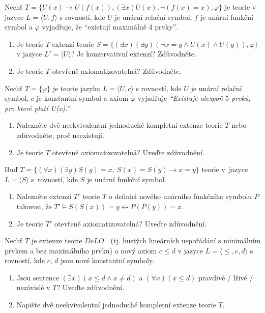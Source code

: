 \documentclass[a4paper,12pt]{article}
\begin{document}
\medskip\begin{problem}
    Nechť $T = \{U(x) \to U(f(x)), (\exists x)U(x), \neg (f(x) = x), \varphi\}$ je teorie v jazyce $L = \langle U, f \rangle$ s rovností, kde $U$ je unární relační symbol, $f$ je unární funkční symbol a $\varphi$ vyjadřuje, že ``existují maximálně 4 prvky''.
    \begin{enumerate}
    \item Je teorie $T$ extenzí teorie $S = \{ (\exists x)(\exists y)(\neg x = y \land U(x) \land U(y)), \varphi \}$ v jazyce $L' = \langle U \rangle$? Je konzervativní extenzí? Zdůvodněte.
    \item Je teorie $T$ otevřeně axiomatizovatelná? Zdůvodněte.
    \end{enumerate} 
\end{problem}

\medskip\begin{problem}
Nechť $T=\{\varphi\}$ je teorie jazyka $L=\langle U, c \rangle$ s rovností, kde $U$ je unární relační symbol, $c$ je konstantní symbol a axiom $\varphi$ vyjadřuje \emph{``Existuje alespoň $5$ prvků, pro které platí U(x).''}
\begin{enumerate}
\item Nalezněte dvě neekvivalentní jednoduché kompletní extenze teorie $T$ nebo zdůvodněte, proč neexistují.
\item Je teorie $T$ otevřeně axiomatizovatelná? Uveďte zdůvodnění.
\end{enumerate}
\end{problem}


\medskip\begin{problem} %
    Buď $T=\{(\forall x)(\exists y) S(y)=x,\ S(x)=S(y)\to x=y\}$ teorie v~jazyce $L=\langle S\rangle$ s~rovností, kde $S$ je unární funkční symbol.
    \begin{enumerate}
    \item Nalezněte extenzi $T'$ teorie $T$ o definici nového unárního funkčního symbolu $P$ takovou, že $T' \models S(S(x))=y \leftrightarrow P(P(y))=x$.
    \item Je teorie $T'$ otevřeně axiomatizovatelná? Uveďte zdůvodnění.
    \end{enumerate} 
\end{problem} 


\medskip\begin{problem}
    Nechť $T$ je extenze teorie $DeLO^-$ (tj. hustých lineárních uspořádání s minimálním prvkem a bez maximálního prvku) o nový axiom $c \le d$ v jazyce $L=\langle \le,c,d\rangle$ s rovností, kde $c$, $d$ jsou nové konstantní symboly.
    \begin{enumerate}
    \item Jsou sentence $(\exists x)(x\le d \wedge x \ne d)$ a $(\forall x)(x \le d)$ pravdivé / lživé / nezávislé v $T$? Uveďte zdůvodnění.
    \item Napište dvě neekvivalentní jednoduché kompletní extenze teorie $T$.
    \end{enumerate} 
\end{problem}
\end{document}
